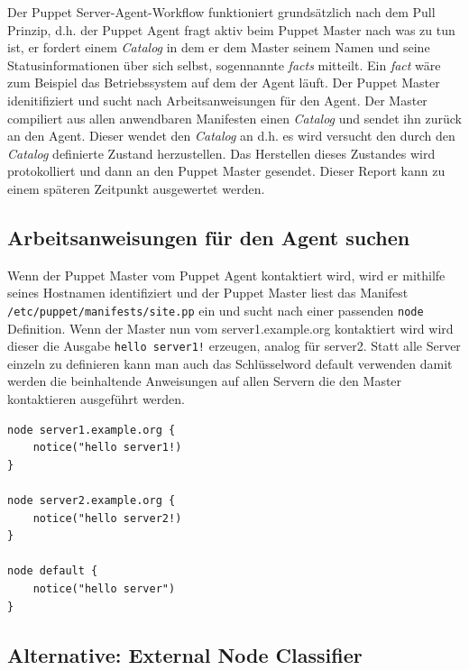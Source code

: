 \documentclass[12pt,a4paper,ngerman]{article}
\begin{document}
Der Puppet Server-Agent-Workflow funktioniert grundsätzlich nach dem Pull Prinzip, d.h. der Puppet Agent fragt aktiv beim Puppet Master nach was zu tun ist, er fordert einem \textit{Catalog} in dem er dem Master seinem Namen und seine Statusinformationen über sich selbst, sogennannte \textit{facts} mitteilt. Ein \textit{fact} wäre zum Beispiel das Betriebssystem auf dem der Agent läuft. Der Puppet Master idenitifiziert und sucht nach Arbeitsanweisungen für den Agent. Der Master compiliert aus allen anwendbaren Manifesten einen \textit{Catalog} und sendet ihn zurück an den Agent. Dieser wendet den \textit{Catalog} an d.h. es wird versucht den durch den \textit{Catalog} definierte Zustand herzustellen. Das Herstellen dieses Zustandes wird protokolliert und dann an den Puppet Master gesendet. Dieser Report kann zu einem späteren Zeitpunkt ausgewertet werden.


\subsection{Arbeitsanweisungen für den Agent suchen}

Wenn der Puppet Master vom Puppet Agent kontaktiert wird, wird er mithilfe seines Hostnamen identifiziert und der Puppet Master liest das Manifest \lstinline$/etc/puppet/manifests/site.pp$ ein und sucht nach einer passenden \lstinline$node$ Definition. Wenn der Master nun vom server1.example.org kontaktiert wird wird dieser die Ausgabe \lstinline$hello server1!$ erzeugen, analog für server2. Statt alle Server einzeln zu definieren kann man auch das Schlüsselword default verwenden damit werden die beinhaltende Anweisungen auf allen Servern die den Master kontaktieren ausgeführt werden. 

\begin{lstlisting}[language=puppet,caption=Node Definitionen in /etc/puppet/manifests/site.pp, label=puppet-node-classifier]
node server1.example.org {
    notice("hello server1!)
}

node server2.example.org {
    notice("hello server2!)
}

node default {
    notice("hello server")
}

\end{lstlisting}  

\subsection{Alternative: External Node Classifier}
     
\end{document}
